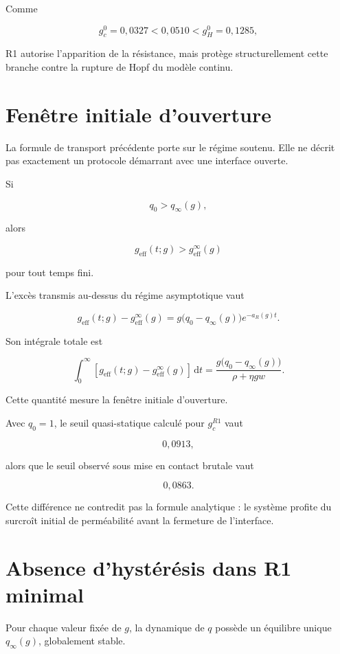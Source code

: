Comme

\[
g_c^0=0{,}0327
<
0{,}0510
<
g_H^0=0{,}1285,
\]

R1 autorise l'apparition de la résistance, mais protège
structurellement cette branche contre la rupture de Hopf du modèle
continu.

\section{Fenêtre initiale d'ouverture}
\label{annexe-r1-fenetre-initiale}

La formule de transport précédente porte sur le régime soutenu. Elle
ne décrit pas exactement un protocole démarrant avec une interface
ouverte.

Si

\[
q_0>q_\infty(g),
\]

alors

\[
g_{\mathrm{eff}}(t;g)
>
g_{\mathrm{eff}}^\infty(g)
\]

pour tout temps fini.

L'excès transmis au-dessus du régime asymptotique vaut

\[
g_{\mathrm{eff}}(t;g)
-
g_{\mathrm{eff}}^\infty(g)
=
g
\bigl(
q_0-q_\infty(g)
\bigr)
e^{-a_R(g)t}.
\]

Son intégrale totale est

\[
\boxed{
\int_0^\infty
\left[
g_{\mathrm{eff}}(t;g)
-
g_{\mathrm{eff}}^\infty(g)
\right]
\,\mathrm dt
=
\frac{
g\bigl(q_0-q_\infty(g)\bigr)
}{
\rho+\eta gw
}.
}
\]

Cette quantité mesure la fenêtre initiale d'ouverture.

Avec \(q_0=1\), le seuil quasi-statique calculé pour
\(g_c^{R1}\) vaut

\[
0{,}0913,
\]

alors que le seuil observé sous mise en contact brutale vaut

\[
0{,}0863.
\]

Cette différence ne contredit pas la formule analytique : le système
profite du surcroît initial de perméabilité avant la fermeture de
l'interface.

\section{Absence d'hystérésis dans R1 minimal}
\label{annexe-r1-absence-hysteresis}

Pour chaque valeur fixée de \(g\), la dynamique de \(q\) possède un
équilibre unique \(q_\infty(g)\), globalement stable.

